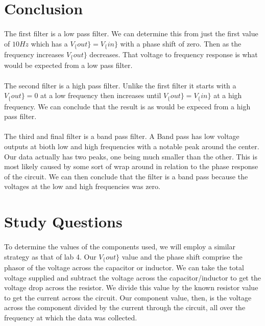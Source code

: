 \documentclass{article}
\begin{document}
\section*{Conclusion}
\paragraph{}
The first filter is a low pass filter. We can determine this from just the first value of $10Hz$ which has a 
$V_\{out\} = V_\{in\}$ with a phase shift of zero. Then as the frequency increases $V_\{out\}$ decreases. That
voltage to frequency response is what would be expected from a low pass filter.
\paragraph{}
The second filter is a high pass filter. Unlike the first filter it starts with a $V_\{out\} = 0$ at a low frequency
 then increases until $V_\{out\} = V_\{in\}$ at a high frequency. We can conclude that the result is as would be 
 expeced from a high pass filter.
 \paragraph{}
 The third and final filter is a band pass filter. A Band pass has low voltage outputs at bioth low and high frequencies 
 with a notable peak around the center. Our data actually has two peaks, one being much smaller than the other. This 
 is most likely caused by some sort of wrap around in relation to the phase response of the circuit. We can then conclude
 that the filter is a band pass because the voltages at the low and high frequencies was zero.


\section*{Study Questions}
\paragraph{}
To determine the values of the components used, we will employ a similar strategy as that of lab 4. Our $V_\{out\}$
 value and the phase shift comprise the phasor of the voltage across the capacitor or inductor. We can take the 
 total voltage supplied and subtract the voltage across the capacitor/inductor to get the voltage drop across the 
 resistor. We divide this value by the known resistor value to get the current across the circuit. Our component value,
 then, is the voltage across the component divided by the current through the circuit, all over the frequency at which 
 the data was collected.
\end{document}
